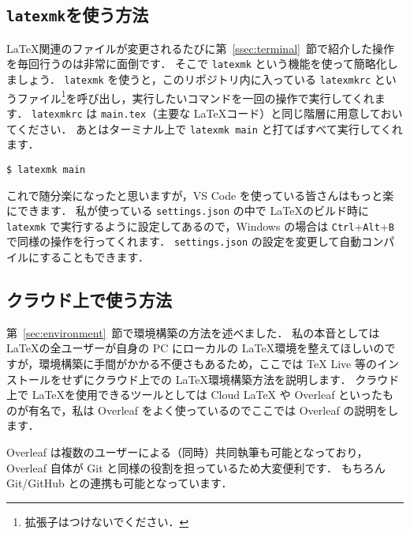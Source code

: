 \subsection{\texttt{latexmk}を使う方法}
\label{ssec:latexmk}

\LaTeX 関連のファイルが変更されるたびに第~\ref{ssec:terminal}~節で紹介した操作を毎回行うのは非常に面倒です．
そこで \verb|latexmk| という機能を使って簡略化しましょう．
\verb|latexmk| を使うと，このリポジトリ内に入っている \verb|latexmkrc| というファイル\footnote{拡張子はつけないでください．}を呼び出し，実行したいコマンドを一回の操作で実行してくれます．
\verb|latexmkrc| は \verb|main.tex|（主要な \LaTeX コード）と同じ階層に用意しておいてください．
あとはターミナル上で \verb|latexmk main| と打てばすべて実行してくれます．

\begin{tcolorbox}[enhanced, title=\texttt{latexmk}を使用, drop fuzzy shadow]
\begin{verbatim}
$ latexmk main
\end{verbatim}
\end{tcolorbox}

これで随分楽になったと思いますが，VS Code を使っている皆さんはもっと楽にできます．
私が使っている \verb|settings.json| の中で \LaTeX のビルド時に \verb|latexmk| で実行するように設定してあるので，Windows の場合は \verb|Ctrl|+\verb|Alt|+\verb|B| で同様の操作を行ってくれます．
\verb|settings.json| の設定を変更して自動コンパイルにすることもできます．


\subsection{クラウド上で使う方法}
\label{ssec:cloud}

第~\ref{sec:environment}~節で環境構築の方法を述べました．
私の本音としては \LaTeX の全ユーザーが自身の PC にローカルの \LaTeX 環境を整えてほしいのですが，環境構築に手間がかかる不便さもあるため，ここでは TeX Live 等のインストールをせずにクラウド上での \LaTeX 環境構築方法を説明します．
クラウド上で \LaTeX を使用できるツールとしては Cloud LaTeX や Overleaf といったものが有名で，私は Overleaf をよく使っているのでここでは Overleaf の説明をします．

Overleaf は複数のユーザーによる（同時）共同執筆も可能となっており，Overleaf 自体が Git と同様の役割を担っているため大変便利です．
もちろん Git/GitHub との連携も可能となっています．



